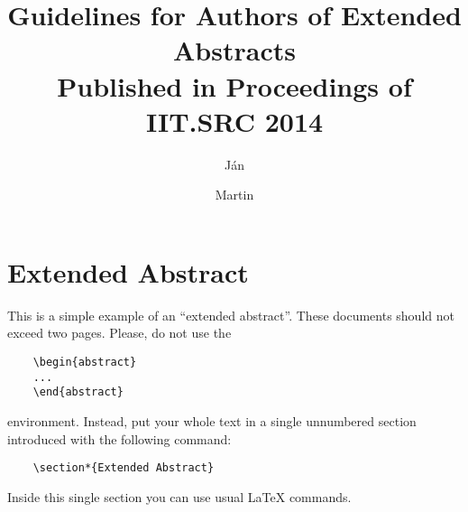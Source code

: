 \documentclass{iitsrc}
\title{Guidelines for Authors of Extended Abstracts\\Published in Proceedings of IIT.SRC 2014}
\author{Ján}{Novák}
\author{Martin}{Kováč}
\begin{document}
\section*{Extended Abstract}

This is a simple example of an ``extended abstract''. These documents should not exceed two pages. Please, do not use the
\begin{verbatim}
    \begin{abstract}
    ...
    \end{abstract}
\end{verbatim}
environment. Instead, put your whole text in a single unnumbered section introduced with the following command:
\begin{verbatim}
    \section*{Extended Abstract}
\end{verbatim}
Inside this single section you can use usual \LaTeX{} commands.

\nocite{lamport:latex}




\end{document}
